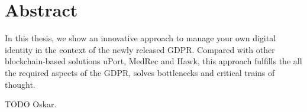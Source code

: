 \chapter*{Abstract}
\label{cha:abstract}

In this thesis, we show an innovative approach to manage your own digital identity in the context
of the newly released GDPR. Compared with other blockchain-based solutions uPort, MedRec and Hawk,
this approach fulfills the all the required aspects of the GDPR, solves bottlenecks and critical
trains of thought.

TODO Oskar.